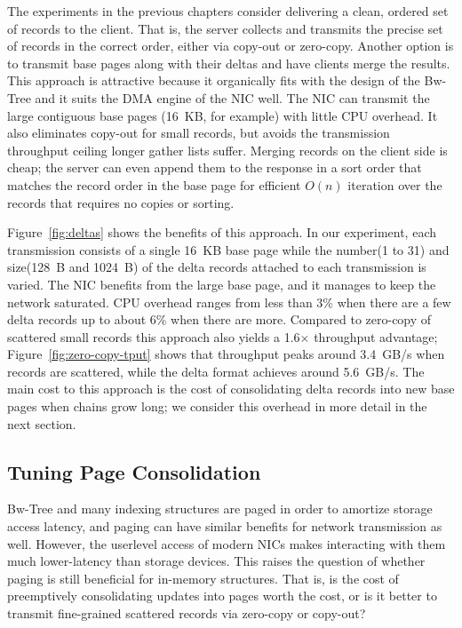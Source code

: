 The experiments in the previous chapters consider delivering a clean, ordered set of records to the
client. That is, the server collects and transmits the precise set of records
in the correct order, either via copy-out or zero-copy. Another option is to
transmit base pages along with their deltas and have clients merge the results.
This approach is attractive because it organically fits with the design of the
Bw-Tree and it suits the DMA engine of the NIC well.  The NIC can transmit the
large contiguous base pages (16~KB, for example) with little CPU overhead.
It also eliminates copy-out for small records, but avoids the transmission
throughput ceiling longer gather lists suffer. %
Merging records on the client side is cheap; the server can even append them to
the response in a sort order that matches the record order in the base page for
efficient $O(n)$ iteration over the records that requires no copies or sorting.

Figure~\ref{fig:deltas} shows the benefits of this approach. In our
experiment, each transmission consists of a single 16~KB base page while the
number(1 to 31) and size(128~B and 1024~B) of the delta records attached to each transmission is varied.
The NIC benefits from the large base page, and it manages to keep the network
saturated. CPU overhead ranges from less than 3\% when there are a few delta
records up to about 6\% when there are more. Compared to zero-copy of scattered
small records this approach also yields a 1.6$\times$ throughput advantage;
Figure~\ref{fig:zero-copy-tput} shows that throughput peaks around 3.4~GB/s when
records are scattered, while the delta format achieves around 5.6~GB/s. The main cost 
to this approach is the cost of consolidating delta records into new base pages 
when chains grow long; we consider this overhead in more detail in the next section.


\subsection{Tuning Page Consolidation}
\label{sec:consolidation}


Bw-Tree and many indexing structures are paged in order to amortize storage
access latency, and paging can have similar benefits for network transmission
as well. However, the userlevel access of modern NICs makes interacting with
them much lower-latency than storage devices. This raises the question of
whether paging is still beneficial for in-memory structures. That is, is the
cost of preemptively consolidating updates into pages worth the cost, or is it
better to transmit fine-grained scattered records via zero-copy or copy-out?

